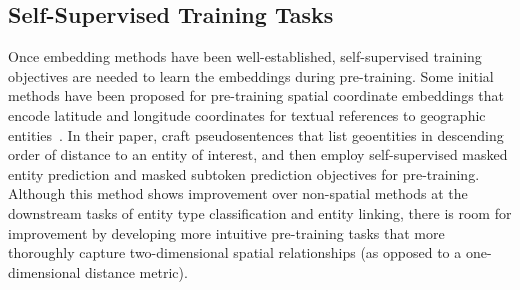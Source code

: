 





\subsection{Self-Supervised Training Tasks}
Once embedding methods have been well-established, self-supervised training objectives are needed to learn the embeddings during pre-training.
%
Some initial methods have been proposed for pre-training spatial coordinate embeddings that encode latitude and longitude coordinates for textual references to geographic entities~\cite{Li2021}.
In their paper, \citeauthor{Li2021} craft pseudosentences that list geoentities in descending order of distance to an entity of interest, and then employ self-supervised masked entity prediction and masked subtoken prediction objectives for pre-training.
Although this method shows improvement over non-spatial methods at the downstream tasks of entity type classification and entity linking, there is room for improvement by developing more intuitive pre-training tasks that more thoroughly capture two-dimensional spatial relationships (as opposed to a one-dimensional distance metric).


